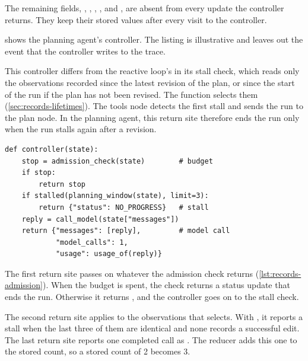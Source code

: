 The remaining fields, , , , ,
 and , are absent from every update the controller
returns. They keep their stored values after every visit to the controller.

 shows the planning agent's controller. The listing is illustrative and
leaves out the event that the controller writes to the trace.

This controller differs from the reactive loop's in its stall check, which reads only the
observations recorded since the latest revision of the plan, or since the start of the run if the
plan has not been revised. The function  selects them
(\cref{sec:records-lifetimes}). The tools node detects the first stall and sends the run to the plan
node. In the planning agent, this return site therefore ends the run only when the run stalls again
after a revision.

\noindent\begin{minipage}{\linewidth}
\begin{lstlisting}[basicstyle=\ttfamily\footnotesize, caption={Illustrative code for the planning
agent's controller node. Each \texttt{return} is one return site.}, label=lst:records-controller]
def controller(state):
    stop = admission_check(state)        # budget
    if stop:
        return stop
    if stalled(planning_window(state), limit=3):
        return {"status": NO_PROGRESS}   # stall
    reply = call_model(state["messages"])
    return {"messages": [reply],         # model call
            "model_calls": 1,
            "usage": usage_of(reply)}
\end{lstlisting}
\end{minipage}

The first return site passes on whatever the admission check returns (\cref{lst:records-admission}).
When the budget is spent, the check returns a status update that ends the run. Otherwise it returns
, and the controller goes on to the stall check.

The second return site applies  to the observations that
 selects. With , it reports a stall when the last three of
them are identical and none records a successful edit. The last return site reports one completed
call as . The reducer adds this one to the stored count, so a stored count
of 2 becomes 3.

